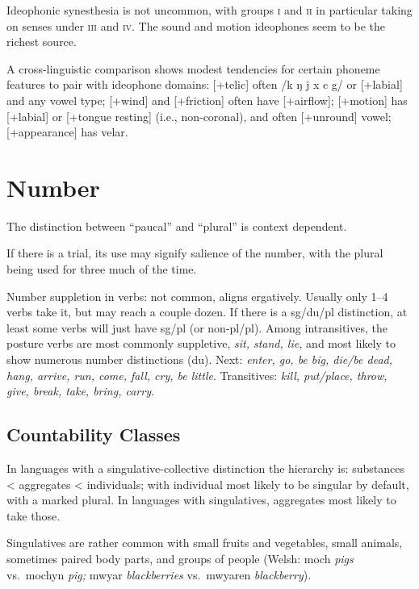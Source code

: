 \documentclass[11pt]{article}
\newcommand{\I}[1]{\textsc{#1}}   %
\begin{document}
Ideophonic synesthesia is not uncommon, with groups \I{i} and \I{ii}
in particular taking on senses under \I{iii} and \I{iv}.  The sound
and motion ideophones seem to be the richest source.

A cross-linguistic comparison shows modest tendencies for certain
phoneme features to pair with ideophone domains: [+telic] often /k ŋ j
x c g/ or [+labial] and any vowel type; [+wind] and [+friction] often
have [+airflow]; [+motion] has [+labial] or [+tongue resting] (i.e.,
non-coronal), and often [+unround] vowel; [+appearance] has velar.

\section{Number}
The distinction between ``paucal'' and ``plural'' is context
dependent. 

If there is a trial, its use may signify salience of the number, with
the plural being used for three much of the time.

Number suppletion in verbs: not common, aligns ergatively.  Usually
only 1--4 verbs take it, but may reach a couple dozen.  If there is a
sg/du/pl distinction, at least some verbs will just have sg/pl (or
non-pl/pl).  Among intransitives, the posture verbs are most commonly
suppletive, \textit{sit, stand, lie,} and most likely to show numerous
number distinctions (du).  Next: \textit{enter, go, be big, die/be
  dead, hang, arrive, run, come, fall, cry, be little}.  Transitives:
\textit{kill, put/place, throw, give, break, take, bring, carry}.


\subsection{Countability Classes}  In languages with a
singulative-collective distinction the hierarchy is: substances <
aggregates < individuals; with individual most likely to be singular
by default, with a marked plural.  In languages with singulatives,
aggregates most likely to take those.

Singulatives are rather common with small fruits and vegetables, small
animals, sometimes paired body parts, and groups of people (Welsh:
moch \textit{pigs} vs.\ mochyn \textit{pig;} mwyar
\textit{blackberries} vs.\ mwyaren \textit{blackberry}).
\end{document}
